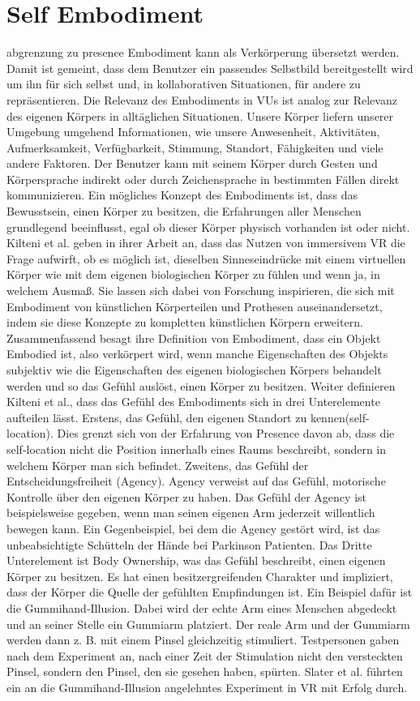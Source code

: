 \section{Self Embodiment}
abgrenzung zu presence
Embodiment kann als Verkörperung übersetzt werden. Damit ist gemeint, dass dem Benutzer ein passendes Selbstbild bereitgestellt wird um ihn für sich selbst und, in kollaborativen Situationen, für andere zu repräsentieren. Die Relevanz des Embodiments in VUs ist analog zur Relevanz des eigenen Körpers in alltäglichen Situationen. Unsere Körper liefern unserer Umgebung umgehend Informationen, wie unsere Anwesenheit, Aktivitäten, Aufmerksamkeit, Verfügbarkeit, Stimmung, Standort, Fähigkeiten und viele andere Faktoren. Der Benutzer kann mit seinem Körper durch Gesten und Körpersprache indirekt oder durch Zeichensprache in bestimmten Fällen direkt kommunizieren. \cite{Benford2010}
Ein mögliches Konzept des Embodiments ist, dass das Bewusstsein, einen Körper zu besitzen, die Erfahrungen aller Menschen grundlegend beeinflusst, egal ob dieser Körper physisch vorhanden ist oder nicht.\cite{Tham2018} Kilteni et al. \cite{Kilteni2012} geben in ihrer Arbeit an, dass das Nutzen von immersivem VR die Frage aufwirft, ob es möglich ist, dieselben Sinneseindrücke mit einem virtuellen Körper wie mit dem eigenen biologischen Körper zu fühlen und wenn ja, in welchem Ausmaß. Sie lassen sich  dabei von Forschung inspirieren, die sich mit Embodiment von künstlichen Körperteilen und Prothesen auseinandersetzt, indem sie diese Konzepte zu kompletten künstlichen Körpern erweitern. Zusammenfassend besagt ihre Definition von Embodiment, dass ein Objekt Embodied ist, also verkörpert wird, wenn manche Eigenschaften des Objekts subjektiv wie die Eigenschaften des eigenen biologischen Körpers behandelt werden und so das Gefühl auslöst, einen Körper zu besitzen.
Weiter definieren Kilteni et al., dass das Gefühl des Embodiments sich in drei Unterelemente aufteilen lässt. Erstens, das Gefühl, den eigenen Standort zu kennen(self-location).  Dies grenzt sich von der Erfahrung von Presence davon ab, dass die self-location nicht die Position innerhalb eines Raums beschreibt, sondern in welchem Körper man sich befindet. Zweitens, das Gefühl der Entscheidungsfreiheit (Agency). Agency verweist auf das Gefühl, motorische Kontrolle über den eigenen Körper zu haben. Das Gefühl der Agency ist beispielsweise gegeben, wenn man seinen eigenen Arm jederzeit willentlich bewegen kann. Ein Gegenbeispiel, bei dem die Agency gestört wird, ist das unbeabsichtigte Schütteln der Hände bei Parkinson Patienten. Das Dritte Unterelement ist Body Ownership, was das Gefühl beschreibt, einen eigenen Körper zu besitzen. Es hat einen besitzergreifenden Charakter und impliziert, dass der Körper die Quelle der gefühlten Empfindungen ist. Ein Beispiel dafür ist die Gummihand-Illusion. Dabei wird der echte Arm eines Menschen abgedeckt und an seiner Stelle ein Gummiarm platziert. Der reale Arm und der Gummiarm werden dann z. B. mit einem Pinsel gleichzeitig stimuliert. Testpersonen gaben nach dem Experiment an, nach einer Zeit der Stimulation nicht den versteckten Pinsel, sondern den Pinsel, den sie gesehen haben, spürten.\cite{Botvinick1998} Slater et al. \cite{Slater2008} führten ein an die Gummihand-Illusion angelehntes Experiment in VR mit Erfolg durch.


